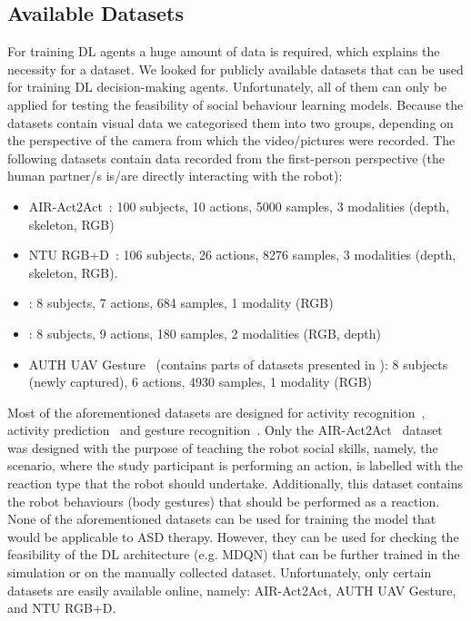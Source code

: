 \documentclass[thesis]{mas_proposal}
\begin{document}
\subsection{Available Datasets}
 For training DL agents a huge amount of data is required, which explains the necessity for a dataset. We looked for publicly available datasets that can be used for training DL decision-making agents. Unfortunately, all of them can only be applied for testing the feasibility of social behaviour learning models. Because the datasets contain visual data we categorised them into two groups, depending on the perspective of the camera from which the video/pictures were recorded. The following datasets contain data recorded from the first-person perspective (the human partner/s is/are directly interacting with the robot):
\begin{itemize}
	\item AIR-Act2Act~\cite{Ko2021}: 100 subjects, 10 actions, 5000 samples, 3 modalities (depth, skeleton, RGB)
	\item NTU RGB+D~\cite{Shahroudy_2016_CVPR,Liu2020}: 106 subjects, 26 actions, 8276 samples, 3 modalities (depth, skeleton, RGB).
	\item \cite{ryoo2013firstperson}: 8 subjects, 7 actions, 684 samples, 1 modality (RGB) 
	\item \cite{ryoo2015robot}: 8 subjects, 9 actions, 180 samples, 2 modalities (RGB, depth)
	\item AUTH UAV Gesture~\cite{patrona2021overview} (contains parts of datasets presented in \cite{Shahroudy_2016_CVPR,Perera_2018_ECCV_Workshops}): 8 subjects (newly captured), 6 actions, 4930 samples, 1 modality (RGB) 
\end{itemize}

Most of the aforementioned datasets are designed for activity recognition~\cite{Shahroudy_2016_CVPR,Liu2020,ryoo2013firstperson}, activity prediction~\cite{ryoo2015robot} and gesture recognition~\cite{patrona2021overview}. Only the AIR-Act2Act~\cite{Ko2021} dataset was designed with the purpose of teaching the robot social skills, namely, the scenario, where the study participant is performing an action, is labelled with the reaction type that the robot should undertake. Additionally, this dataset contains the robot behaviours (body gestures) that should be performed as a reaction. None of the aforementioned datasets can be used for training the model that would be applicable to ASD therapy. However, they can be used for checking the feasibility of the DL architecture (e.g. MDQN) that can be further trained in the simulation or on the manually collected dataset. Unfortunately, only certain datasets are easily available online, namely: AIR-Act2Act, AUTH UAV Gesture, and NTU RGB+D.
\end{document}
